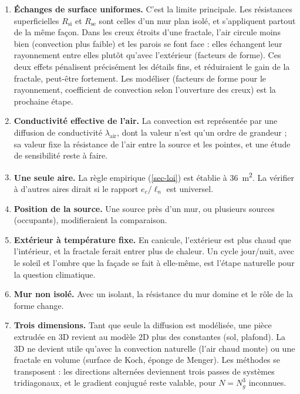 \documentclass[11pt,a4paper]{article}
\theoremstyle{definition}
\theoremstyle{remark}
\newcommand{\Rsi}{R_{\mathrm{si}}}
\newcommand{\Rse}{R_{\mathrm{se}}}
\newcommand{\la}{\lambda_{\mathrm{air}}}
\begin{document}
\begin{enumerate}
  \item \textbf{Échanges de surface uniformes.} C'est la limite principale. Les
  résistances superficielles $\Rsi$ et $\Rse$ sont celles d'un mur plan isolé, et
  s'appliquent partout de la même façon. Dans les creux étroits d'une fractale, l'air
  circule moins bien (convection plus faible) et les parois se font face : elles
  échangent leur rayonnement entre elles plutôt qu'avec l'extérieur (facteurs de
  forme). Ces deux effets pénalisent précisément les détails fins, et réduiraient le
  gain de la fractale, peut-être fortement. Les modéliser (facteurs de forme pour le
  rayonnement, coefficient de convection selon l'ouverture des creux) est la
  prochaine étape.
  \item \textbf{Conductivité effective de l'air.} La convection est représentée par
  une diffusion de conductivité $\la$, dont la valeur n'est qu'un ordre de grandeur ;
  sa valeur fixe la résistance de l'air entre la source et les pointes, et une
  étude de sensibilité reste à faire.
  \item \textbf{Une seule aire.} La règle empirique (\cref{sec-loi}) est établie à
  \qty{36}{\square\metre}. La vérifier à d'autres aires dirait si le rapport
  $e_c/\ell_n$ est universel.
  \item \textbf{Position de la source.} Une source près d'un mur, ou plusieurs sources
  (occupants), modifieraient la comparaison.
  \item \textbf{Extérieur à température fixe.} En canicule, l'extérieur est plus chaud
  que l'intérieur, et la fractale ferait entrer plus de chaleur. Un cycle jour/nuit,
  avec le soleil et l'ombre que la façade se fait à elle-même, est l'étape naturelle
  pour la question climatique.
  \item \textbf{Mur non isolé.} Avec un isolant, la résistance du mur domine et le rôle
  de la forme change.
  \item \textbf{Trois dimensions.} Tant que seule la diffusion est modélisée, une pièce
  extrudée en 3D revient au modèle 2D plus des constantes (sol, plafond). La 3D ne
  devient utile qu'avec la convection naturelle (l'air chaud monte) ou une fractale en
  volume (surface de Koch, éponge de Menger). Les méthodes se transposent : les
  directions alternées deviennent trois passes de systèmes tridiagonaux, et le
  gradient conjugué reste valable, pour $N = N_g^3$ inconnues.
\end{enumerate}

\end{document}
